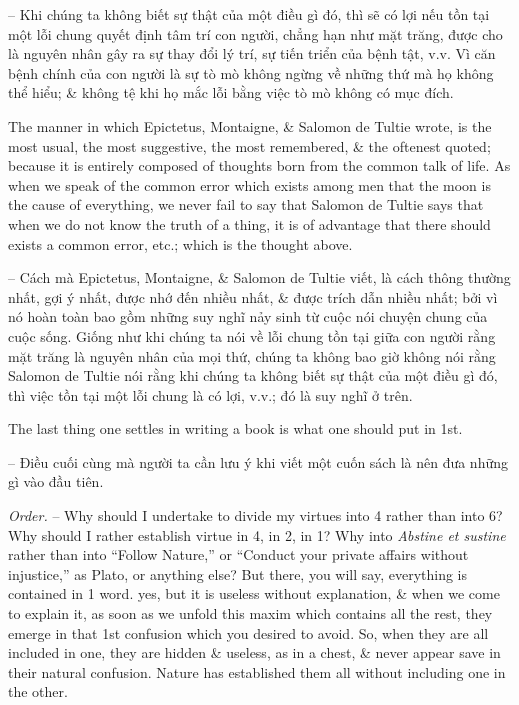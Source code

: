 \documentclass{article}
\begin{document}
\begin{enumerate}
\begin{itemize}
		-- Khi chúng ta không biết sự thật của một điều gì đó, thì sẽ có lợi nếu tồn tại một lỗi chung quyết định tâm trí con người, chẳng hạn như mặt trăng, được cho là nguyên nhân gây ra sự thay đổi lý trí, sự tiến triển của bệnh tật, v.v. Vì căn bệnh chính của con người là sự tò mò không ngừng về những thứ mà họ không thể hiểu; \& không tệ khi họ mắc lỗi bằng việc tò mò không có mục đích.
		
		The manner in which {\sc Epictetus, Montaigne, \& Salomon de Tultie} wrote, is the most usual, the most suggestive, the most remembered, \& the oftenest quoted; because it is entirely composed of thoughts born from the common talk of life. As when we speak of the common error which exists among men that the moon is the cause of everything, we never fail to say that {\sc Salomon de Tultie} says that when we do not know the truth of a thing, it is of advantage that there should exists a common error, etc.; which is the thought above.
		
		-- Cách mà {\sc Epictetus, Montaigne, \& Salomon de Tultie} viết, là cách thông thường nhất, gợi ý nhất, được nhớ đến nhiều nhất, \& được trích dẫn nhiều nhất; bởi vì nó hoàn toàn bao gồm những suy nghĩ nảy sinh từ cuộc nói chuyện chung của cuộc sống. Giống như khi chúng ta nói về lỗi chung tồn tại giữa con người rằng mặt trăng là nguyên nhân của mọi thứ, chúng ta không bao giờ không nói rằng {\sc Salomon de Tultie} nói rằng khi chúng ta không biết sự thật của một điều gì đó, thì việc tồn tại một lỗi chung là có lợi, v.v.; đó là suy nghĩ ở trên.
		
		 The last thing one settles in writing a book is what one should put in 1st.
		
		-- Điều cuối cùng mà người ta cần lưu ý khi viết một cuốn sách là nên đưa những gì vào đầu tiên.
		
		 {\it Order.} -- Why should I undertake to divide my virtues into 4 rather than into 6? Why should I rather establish virtue in 4, in 2, in 1? Why into {\it Abstine et sustine} rather than into ``Follow Nature,'' or ``Conduct your private affairs without injustice,'' as {\sc Plato}, or anything else? But there, you will say, everything is contained in 1 word. yes, but it is useless without explanation, \& when we come to explain it, as soon as we unfold this maxim which contains all the rest, they emerge in that 1st confusion which you desired to avoid. So, when they are all included in one, they are hidden \& useless, as in a chest, \& never appear save in their natural confusion. Nature has established them all without including one in the other.
		

\end{itemize}
\end{enumerate}
\end{document}
